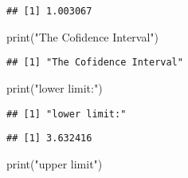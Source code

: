 \documentclass[
]{article}
\newenvironment{Shaded}{\begin{snugshade}}{\end{snugshade}}
\newcommand{\CommentTok}[1]{\textcolor[rgb]{0.56,0.35,0.01}{\textit{#1}}}
\newcommand{\DecValTok}[1]{\textcolor[rgb]{0.00,0.00,0.81}{#1}}
\newcommand{\FloatTok}[1]{\textcolor[rgb]{0.00,0.00,0.81}{#1}}
\newcommand{\FunctionTok}[1]{\textcolor[rgb]{0.00,0.00,0.00}{#1}}
\newcommand{\NormalTok}[1]{#1}
\newcommand{\SpecialCharTok}[1]{\textcolor[rgb]{0.00,0.00,0.00}{#1}}
\newcommand{\StringTok}[1]{\textcolor[rgb]{0.31,0.60,0.02}{#1}}
\begin{document}
\begin{Shaded}
\end{Shaded}

\begin{verbatim}
## [1] 1.003067
\end{verbatim}

\begin{Shaded}
\begin{Highlighting}[]
\FunctionTok{print}\NormalTok{(}\StringTok{"The Cofidence Interval"}\NormalTok{)}
\end{Highlighting}
\end{Shaded}

\begin{verbatim}
## [1] "The Cofidence Interval"
\end{verbatim}

\begin{Shaded}
\begin{Highlighting}[]
\FunctionTok{print}\NormalTok{(}\StringTok{"lower limit:"}\NormalTok{)}
\end{Highlighting}
\end{Shaded}

\begin{verbatim}
## [1] "lower limit:"
\end{verbatim}

\begin{Shaded}
\end{Shaded}

\begin{verbatim}
## [1] 3.632416
\end{verbatim}

\begin{Shaded}
\begin{Highlighting}[]
\FunctionTok{print}\NormalTok{(}\StringTok{"upper limit"}\NormalTok{)}
\end{Highlighting}
\end{Shaded}
\end{document}
